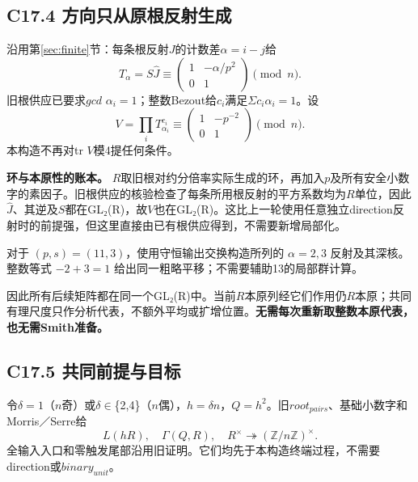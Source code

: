 \documentclass[11pt,a4paper]{article}
\theoremstyle{definition}
\numberwithin{equation}{section}
\begin{document}
\subsection*{\texorpdfstring{{C17.4} {方向只从原根反射生成}}{C17.4 方向只从原根反射生成}}\label{C17-h126}

{沿用}第\ref{sec:finite}节{：每条根反射\ensuremath{J}的计数差\ensuremath{\alpha =i-j}给} \[
T_\alpha=S\widehat J
\equiv\begin{pmatrix}1&-\alpha/p^2\\0&1\end{pmatrix}\pmod n.
\] {旧根供应已要求\ensuremath{gcd}} {\ensuremath{\alpha _{i}=1}；整数Bezout给\ensuremath{c_{i}}满足\ensuremath{\Sigma c_{i}\alpha _{i}=1}。设} \[
\boxed{V=\prod_iT_{\alpha_i}^{c_i}
\equiv\begin{pmatrix}1&-p^{-2}\\0&1\end{pmatrix}\pmod n.}
\tag{C17.4.1}
\] {本构造不再对tr} {\ensuremath{V}模4提任何条件。}

\textbf{{环与本原性的账本。}} {\ensuremath{R}取旧根对约分倍率实际生成的环，再加入\ensuremath{p}及所有安全小数字的素因子。旧根供应的核验检查了每条所用根反射的平方系数均为\ensuremath{R}单位，因此}\(\widehat J\){、其逆及\ensuremath{S}都在GL₂(R)，故\ensuremath{V}也在GL₂(R)。这比上一轮使用任意独立direction反射时的前提强，但这里直接由已有根供应得到，不需要新增局部化。}

{对于} \((p,s)=(11,3)\){，使用守恒输出交换构造所列的} \(\alpha=2,3\) {反射及其深核。整数等式} \(-2+3=1\) {给出同一粗略平移；不需要辅助13的局部群计算。}

{因此所有后续矩阵都在同一个GL₂(R)中。当前\ensuremath{R}本原列经它们作用仍\ensuremath{R}本原；共同有理尺度只作分析代表，不额外平均或扩增位置。}\textbf{{无需每次重新取整数本原代表，也无需Smith准备。}}

\subsection*{\texorpdfstring{{C17.5} {共同前提与目标}}{C17.5 共同前提与目标}}\label{C17-h127}

{令\ensuremath{\delta =1}（\ensuremath{n}奇）或\ensuremath{\delta }\ensuremath{\in}\{2,4\}（\ensuremath{n}偶），\ensuremath{h=\delta n}，\ensuremath{Q=h^{2}}。旧\ensuremath{root_{pairs}}、基础小数字和Morris／Serre给} \[
L(hR),\quad\Gamma(Q,R),\quad
R^\times\twoheadrightarrow(\mathbb Z/n\mathbb Z)^\times.
\] {全输入入口和零触发尾部沿用旧证明。它们均先于本构造终端过程，不需要direction或\ensuremath{binary_{unit}}。}
\end{document}
